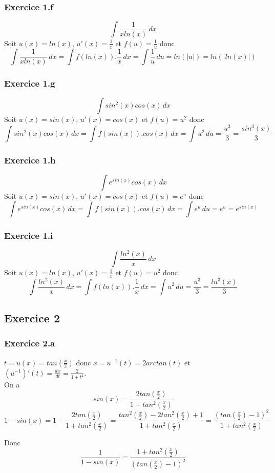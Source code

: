 \documentclass[]{book}
\theoremstyle{definition}
\begin{document}
\subsubsection*{Exercice 1.f}
$$\int{\frac{1}{xln(x)}\,dx}$$
Soit $u(x)=ln(x)$, $u'(x)=\frac{1}{x}$ et $f(u) = \frac{1}{u}$ donc
$$\int{\frac{1}{xln(x)}\,dx} = \int{f(ln(x)).\frac{1}{x}\,dx} = \int{\frac{1}{u}\,du} = ln(|u|) = ln(|ln(x)|)$$

\subsubsection*{Exercice 1.g}
$$\int{sin^2(x)cos(x)\,dx}$$
Soit $u(x)=sin(x)$, $u'(x)=cos(x)$ et $f(u)=u^2$ donc
$$\int{sin^2(x)cos(x)\,dx} = \int{f(sin(x)).cos(x)\,dx} = \int{u^2\,du} = \frac{u^3}{3} = \frac{sin^3(x)}{3}$$

\subsubsection*{Exercice 1.h}
$$\int{e^{sin(x)}cos(x)\,dx}$$
Soit $u(x)=sin(x)$, $u'(x)=cos(x)$ et $f(u)=e^u$ donc
$$\int{e^{sin(x)}cos(x)\,dx} = \int{f(sin(x)).cos(x)\,dx} = \int{e^u\,du} = e^u = e^{sin(x)}$$
 

\subsubsection*{Exercice 1.i}
$$\int{\frac{ln^2(x)}{x}\,dx}$$
Soit $u(x) = ln(x)$, $u'(x)=\frac{1}{x}$ et $f(u)=u^2$ donc
$$\int{\frac{ln^2(x)}{x}\,dx} = \int{f(ln(x)).\frac{1}{x}\,dx} = \int{u^2\,du} = \frac{u^3}{3} = \frac{ln^3(x)}{3}$$


\subsection*{Exercice 2}
\subsubsection*{Exercice 2.a}
$t = u(x) = tan(\frac{x}{2})$ donc $x = u^{-1}(t) = 2arctan(t)$ et $(u^{-1})'(t) = \frac{dx}{dt} = \frac{2}{1+t^2}$.\\
On a 
$$sin(x)=\frac{2tan(\frac{x}{2})}{1+tan^2(\frac{x}{2})}$$ 
$$1-sin(x) = 1 - \frac{2tan(\frac{x}{2})}{1+tan^2(\frac{x}{2})}
= \frac{tan^2(\frac{x}{2})-2tan^2(\frac{x}{2})+1}{1+tan^2(\frac{x}{2})} = \frac{(tan(\frac{x}{2})-1)^2}{1+tan^2(\frac{x}{2})}$$

Donc 
$$\frac{1}{1-sin(x)} = \frac{1+tan^2(\frac{x}{2})}{(tan(\frac{x}{2})-1)^2}$$
\end{document}
